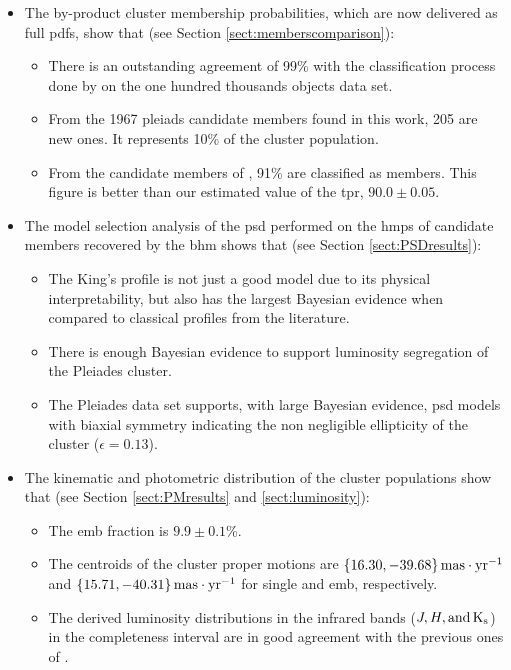 \begin{itemize}
\item The by-product cluster membership probabilities, which are now delivered as full \glspl{pdf}, show that (see Section \ref{sect:memberscomparison}):
\begin{itemize}
\item  There is an outstanding agreement of 99\% with the classification process done by \citet{Bouy2015} on the one hundred thousands objects data set.
\item From the 1967 pleiads candidate members found in this work, 205 are new ones. It represents 10\% of the cluster population. 
\item From the candidate members of \citet{Rebull2016}, 91\% are classified as members. This figure is better than our estimated value of the \acrlong{tpr}, $ 90.0 \pm0.05$.
\end{itemize}
\item The model selection analysis of the \acrfull{psd} performed on the \acrfull{hmps} of candidate members recovered by the \gls{bhm} shows that (see Section \ref{sect:PSDresults}):
\begin{itemize}
\item The King's profile \citep{King1962} is not just a good model due to its physical interpretability, but also has the largest Bayesian evidence when compared to classical profiles from the literature.
\item There is enough Bayesian evidence to support luminosity segregation of the Pleiades cluster.
\item The Pleiades data set supports, with large Bayesian evidence, \gls{psd} models with biaxial symmetry indicating the non negligible ellipticity of the cluster ($\epsilon=0.13$).
\end{itemize}
\item The kinematic and photometric distribution of the cluster populations show that (see Section \ref{sect:PMresults} and \ref{sect:luminosity}):
\begin{itemize}
\item The \acrfull{emb} fraction is $9.9\pm0.1$\%.
\item The centroids of the cluster proper motions are $\{16.30,-39.68\}\,\rm{mas\cdot yr^{-1}}$ and $\{15.71,-40.31\}\,\rm{mas\cdot yr^{-1}}$ for single and \gls{emb}, respectively. 
\item The derived luminosity distributions in the infrared bands ($J,H, \rm{and} \,K_s$) in the completeness interval are in good agreement with the previous ones of \citet{Bouy2015}.

\end{itemize}
\end{itemize}
